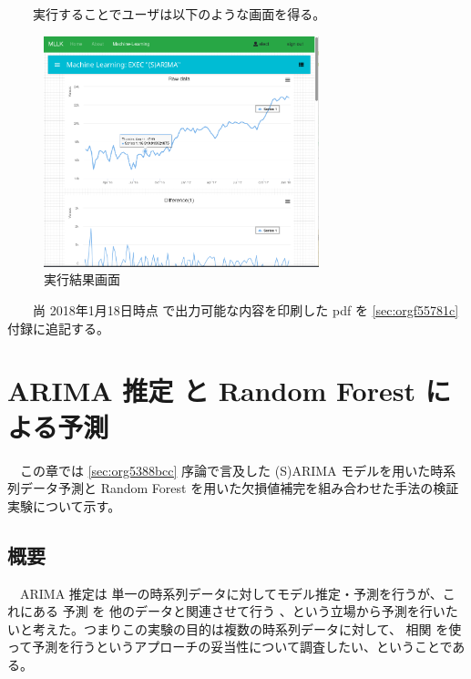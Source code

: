 \documentclass{scrartcl}
\begin{document}
　　実行することでユーザは以下のような画面を得る。\\
\begin{figure}[htbp]
\centering
\includegraphics[width=8cm]{./arima-view.PNG}
\caption{実行結果画面}
\end{figure}

　　尚 2018年1月18日時点 で出力可能な内容を印刷した pdf を \ref{sec:orgf55781c} 付録に追記する。\\
\newpage
\section{ARIMA 推定 と Random Forest による予測}
\label{sec:org26d20d0}
　この章では \ref{sec:org5388bcc} 序論で言及した (S)ARIMA モデルを用いた時系列データ予測と Random Forest を用いた欠損値補完を組み合わせた手法の検証実験について示す。\\
\subsection{概要}
\label{sec:orga756cba}

　ARIMA 推定は 単一の時系列データに対してモデル推定・予測を行うが、これにある 予測 を 他のデータと関連させて行う 、という立場から予測を行いたいと考えた。つまりこの実験の目的は複数の時系列データに対して、 相関 を使って予測を行うというアプローチの妥当性について調査したい、ということである。\\
\end{document}
